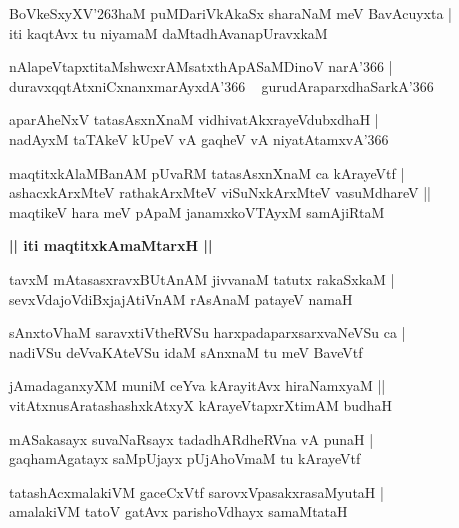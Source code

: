 \documentclass[twoside,12pt,openright]{book}
\def\S{\char'263}
\newcounter{shloka}[chapter]
\def\uvaca#1{\centerline{{\large\textbf{#1}}}}
\begin{document}
\begin{shloka}%
BoVkeSxyXV\S haM puMDariVkAkaSx sharaNaM meV BavAcuyxta |\\
iti kaqtAvx tu niyamaM daMtadhAvanapUravxkaM 
\end{shloka}

\begin{shloka}%
nAlapeVtapxtitaMshwcxrAMsatxthApASaMDinoV narA\char'366 |\\
duravxqqtAtxniCxnanxmarAyxdA\char'366 ~ gurudAraparxdhaSarkA\char'366
\end{shloka}

\begin{shloka}%
aparAheNxV tatasAsxnXnaM vidhivatAkxrayeVdubxdhaH |\\
nadAyxM taTAkeV kUpeV vA gaqheV vA niyatAtamxvA\char'366
\end{shloka}

\begin{shloka}%
maqtitxkAlaMBanAM pUvaRM tatasAsxnXnaM ca kArayeVtf |\\
ashacxkArxMteV rathakArxMteV viSuNxkArxMteV vasuMdhareV ||\\
maqtikeV hara meV pApaM janamxkoVTAyxM samAjiRtaM 
\end{shloka}

\uvaca{|| iti maqtitxkAmaMtarxH ||}

\begin{shloka}%
tavxM mAtasasxravxBUtAnAM jivvanaM tatutx rakaSxkaM |\\
sevxVdajoVdiBxjajAtiVnAM rAsAnaM patayeV namaH
\end{shloka}

\begin{shloka}%
sAnxtoVhaM saravxtiVtheRVSu harxpadaparxsarxvaNeVSu ca |\\
nadiVSu deVvaKAteVSu idaM sAnxnaM tu meV BaveVtf
\end{shloka}

\begin{shloka}%
jAmadaganxyXM muniM ceYva kArayitAvx hiraNamxyaM ||\\
vitAtxnusAratashashxkAtxyX kArayeVtapxrXtimAM budhaH
\end{shloka}

\begin{shloka}%
mASakasayx suvaNaRsayx tadadhARdheRVna vA punaH |\\
gaqhamAgatayx saMpUjayx pUjAhoVmaM tu kArayeVtf
\end{shloka}

\begin{shloka}%
tatashAcxmalakiVM gaceCxVtf sarovxVpasakxrasaMyutaH |\\
amalakiVM tatoV gatAvx parishoVdhayx samaMtataH 
\end{shloka}
\end{document}
